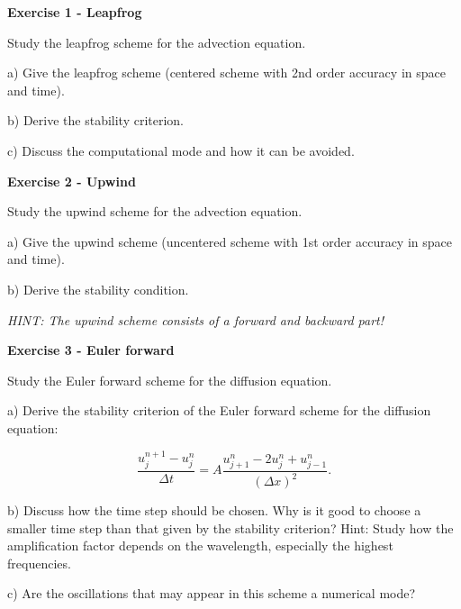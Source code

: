 \begin{question}
    
\textbf{Exercise 1 - Leapfrog}

Study the leapfrog scheme for the advection equation.

a) Give the leapfrog scheme (centered scheme with 2nd order accuracy in space and time).

b) Derive the stability criterion.

c) Discuss the computational mode and how it can be avoided.

\textbf{Exercise 2 - Upwind}

Study the upwind scheme for the advection equation.

a) Give the upwind scheme (uncentered scheme with 1st order accuracy in space and time).

b) Derive the stability condition.

\textit{HINT: The upwind scheme consists of a forward and backward part!}

\textbf{Exercise 3 - Euler forward}

Study the Euler forward scheme for the diffusion equation.

a) Derive the stability criterion of the Euler forward scheme for the diffusion equation:

\[
\frac{u^{n+1}_j - u^n_j}{\Delta t} = A \frac{u^n_{j+1} - 2u^n_j + u^n_{j-1}}{(\Delta x)^2}.
\]

b) Discuss how the time step should be chosen. Why is it good to choose a smaller time step than that given by the stability criterion? Hint: Study how the amplification factor depends on the wavelength, especially the highest frequencies.

c) Are the oscillations that may appear in this scheme a numerical mode?

\end{question}
